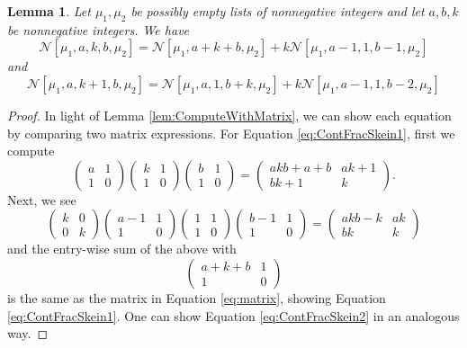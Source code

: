 \documentclass[12pt, letterpaper,table]{amsart}
\newtheorem{lemma}[theorem]{Lemma}
\theoremstyle{remark}
\begin{document}
\begin{lemma}\label{lem:ContFracSkein}
Let $\mu_1,\mu_2$ be possibly empty lists of nonnegative integers and let $a,b,k$ be nonnegative integers. We have \begin{equation}
\mathcal{N}[\mu_1,a,k,b,\mu_2] = \mathcal{N}[\mu_1,a+k+b,\mu_2] + k\mathcal{N}[\mu_1,a-1,1,b-1,\mu_2]\label{eq:ContFracSkein1}
\end{equation}
and 
\begin{equation}
\mathcal{N}[\mu_1,a,k+1,b,\mu_2] = \mathcal{N}[\mu_1,a,1,b+k,\mu_2] + k\mathcal{N}[\mu_1,a-1,1,b-2,\mu_2]\label{eq:ContFracSkein2}
\end{equation}
\end{lemma}

\begin{proof}
In light of Lemma \ref{lem:ComputeWithMatrix}, we can show each equation by comparing two matrix expressions. For Equation \ref{eq:ContFracSkein1}, first we compute \[
\begin{pmatrix} a & 1 \\ 1&0 \end{pmatrix} \begin{pmatrix} k & 1 \\ 1&0 \end{pmatrix}\begin{pmatrix} b & 1 \\ 1&0 \end{pmatrix} = \begin{pmatrix} akb + a + b & ak+1 \\ bk+1 &k \end{pmatrix}.
\]
Next, we see 
\begin{equation}
\begin{pmatrix} k & 0 \\ 0 & k \end{pmatrix}  \begin{pmatrix} a-1 & 1 \\ 1&0 \end{pmatrix} \begin{pmatrix} 1 & 1 \\ 1&0 \end{pmatrix}\begin{pmatrix} b-1 & 1 \\ 1&0 \end{pmatrix} = \begin{pmatrix} akb - k & ak \\ bk & k \end{pmatrix}\label{eq:matrix}
\end{equation}
and the entry-wise sum of the above with \[
\begin{pmatrix} a+k+b & 1 \\ 1&0 \end{pmatrix} \]
is the same as the matrix in Equation \ref{eq:matrix}, showing Equation \ref{eq:ContFracSkein1}. One can show Equation \ref{eq:ContFracSkein2} in an analogous way.
\end{proof}
\end{document}
